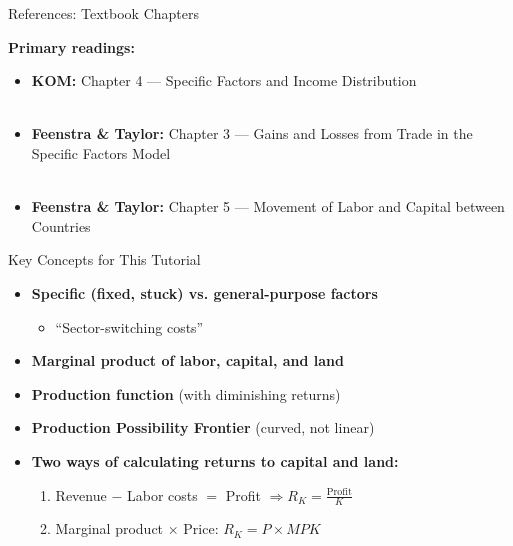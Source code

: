 \documentclass{beamer}
\begin{document}
\begin{frame}{References: Textbook Chapters}

\textbf{Primary readings:}
\begin{itemize}
    \item \textbf{KOM:} Chapter 4 --- Specific Factors and Income Distribution \\~\\
    \item \textbf{Feenstra \& Taylor:} Chapter 3 --- Gains and Losses from Trade in the Specific Factors Model \\~\\
    \item \textbf{Feenstra \& Taylor:} Chapter 5 --- Movement of Labor and Capital between Countries
\end{itemize}
\end{frame}


\begin{frame}{Key Concepts for This Tutorial}

\begin{itemize}
    \item \textbf{Specific (fixed, stuck) vs. general-purpose factors}
    \begin{itemize}
        \item ``Sector-switching costs''
    \end{itemize}
    
    \vspace{0.3cm}
    
    \item \textbf{Marginal product of labor, capital, and land}
    
    \vspace{0.3cm}
    
    \item \textbf{Production function} (with diminishing returns)
    
    \vspace{0.3cm}
    
    \item \textbf{Production Possibility Frontier} (curved, not linear)
    
    \vspace{0.3cm}
    
    \item \textbf{Two ways of calculating returns to capital and land:}
    \begin{enumerate}
        \item Revenue $-$ Labor costs $=$ Profit $\Rightarrow R_K = \frac{\text{Profit}}{K}$
        \item Marginal product $\times$ Price: $R_K = P \times MPK$
    \end{enumerate}
\end{itemize}

\end{frame}
\end{document}
